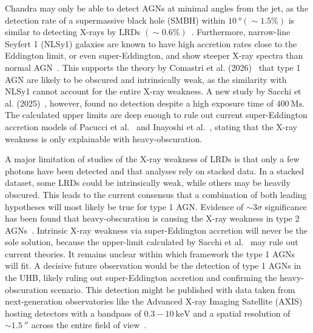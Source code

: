Chandra may only be able to detect AGNs at minimal angles from the jet, as the detection rate of a supermassive black hole (SMBH) within $\SI{10}{\degree} (\sim1.5\%)$ is similar to detecting X-rays by LRDs $(\sim0.6\%)$~\cite{Pacucci_2024}.
Furthermore, narrow-line Seyfert 1 (NLSy1) galaxies are known to have high accretion rates close to the Eddington limit, or even super-Eddington, and show steeper X-ray spectra than normal AGN~\cite{Maiolini_2025}.
This supports the theory by Comastri et al. (2026)~\cite{refId0} that type 1 AGN are likely to be obscured and intrinsically weak, as the similarity with NLSy1 cannot account for the entire X-ray weakness.
A new study by Sacchi et al. (2025)~\cite{Sacchi_2025}, however, found no detection despite a high exposure time of $\SI{400}{\mega\second}$.
The calculated upper limits are deep enough to rule out current super-Eddington accretion models of Pacucci et al.~\cite{Pacucci_2024} and Inayoshi et al.~\cite{inayoshi2025weaknessxraysvariabilityhighredshift}, stating that the X-ray weakness is only explainable with heavy-obscuration.

A major limitation of studies of the X-ray weakness of LRDs is that only a few photons have been detected and that analyses rely on stacked data.
In a stacked dataset, some LRDs could be intrinsically weak, while others may be heavily obscured.
This leads to the current consensus that a combination of both leading hypotheses will most likely be true for type 1 AGN\@. 
Evidence of $\sim3\sigma$ significance has been found that heavy-obscuration is causing the X-ray weakness in type 2 AGNs~\cite{refId0}.
Intrinsic X-ray weakness via super-Eddington accretion will never be the sole solution, because the upper-limit calculated by Sacchi et al.~\cite{Sacchi_2025} may rule out current theories.
It remains unclear within which framework the type 1 AGNs will fit.
A decisive future observation would be the detection of type 1 AGNs in the UHB, likely ruling out super-Eddington accretion and confirming the heavy-obscuration scenario.
This detection might be published with data taken from next-generation observatories like the Advanced X-ray Imaging Satellite (AXIS) hosting detectors with a bandpass of $0.3-10\ \si{\kilo\eV}$ and a spatial resolution of $\sim\SI{1.5}{\arcsecond}$ across the entire field of view~\cite{Reynolds_2023}.
